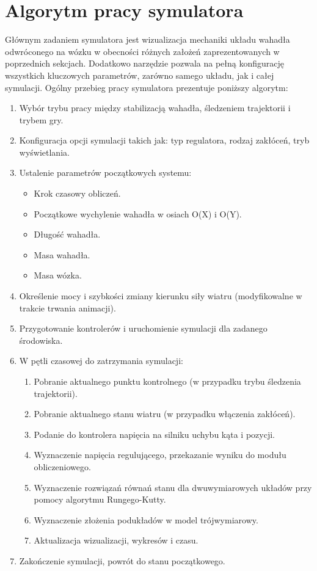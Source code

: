 \documentclass[12pt, oneside]{report}
\theoremstyle{definition}
\begin{document}
\section{Algorytm pracy symulatora}
Głównym zadaniem symulatora jest wizualizacja mechaniki układu wahadła odwróconego na wózku w obecności różnych założeń zaprezentowanych w poprzednich sekcjach. Dodatkowo narzędzie pozwala na pełną konfigurację wszystkich kluczowych parametrów, zarówno samego układu, jak i całej symulacji. Ogólny przebieg pracy symulatora prezentuje poniższy algorytm:
\begin{enumerate}
\item Wybór trybu pracy między stabilizacją wahadła, śledzeniem trajektorii i trybem gry.
\item Konfiguracja opcji symulacji takich jak: typ regulatora, rodzaj zakłóceń, tryb wyświetlania.
\item Ustalenie parametrów początkowych systemu:
\begin{itemize}
\item Krok czasowy obliczeń.
\item Początkowe wychylenie wahadła w osiach O(X) i O(Y).
\item Długość wahadła.
\item Masa wahadła.
\item Masa wózka.
\end{itemize}
\item Określenie mocy i szybkości zmiany kierunku siły wiatru (modyfikowalne w trakcie trwania animacji).
\item Przygotowanie kontrolerów i uruchomienie symulacji dla zadanego środowiska.
\item W pętli czasowej do zatrzymania symulacji:
\begin{enumerate}
\item Pobranie aktualnego punktu kontrolnego (w przypadku trybu śledzenia trajektorii).
\item Pobranie aktualnego stanu wiatru (w przypadku włączenia zakłóceń).
\item Podanie do kontrolera napięcia na silniku uchybu kąta i pozycji.
\item Wyznaczenie napięcia regulującego, przekazanie wyniku do modułu obliczeniowego.
\item Wyznaczenie rozwiązań równań stanu dla dwuwymiarowych układów przy pomocy algorytmu Rungego-Kutty.
\item Wyznaczenie złożenia podukładów w model trójwymiarowy.
\item Aktualizacja wizualizacji, wykresów i czasu.
\end{enumerate}
\item Zakończenie symulacji, powrót do stanu początkowego.
\end{enumerate}
\end{document}
